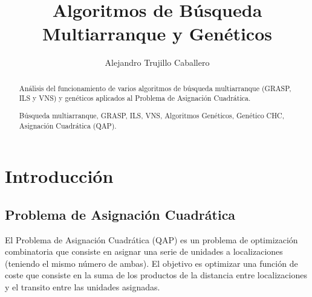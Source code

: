 \documentclass[runningheads,a4paper]{llncs}
\newcommand{\keywords}[1]{\par\addvspace\baselineskip
\noindent\keywordname\enspace\ignorespaces#1}
\begin{document}
\mainmatter  %

\title{Algoritmos de Búsqueda Multiarranque y Genéticos}


%
%
\author{Alejandro Trujillo Caballero
}
%


%
%

\toctitle{}
\maketitle

\begin{abstract}
Análisis del funcionamiento de varios algoritmos de búsqueda multiarranque (GRASP, ILS y VNS) y genéticos aplicados al Problema de Asignación Cuadrática.
\keywords{Búsqueda multiarranque, GRASP, ILS, VNS, Algoritmos Genéticos, Genético CHC, Asignación Cuadrática (QAP).}
\end{abstract}


\section{Introducción}

\subsection{Problema de Asignación Cuadrática}

El Problema de Asignación Cuadrática (QAP) es un problema de optimización combinatoria que consiste en asignar una serie de unidades a localizaciones (teniendo el mismo número de ambas). El objetivo es optimizar una función de coste que consiste en la suma de los productos de la distancia entre localizaciones y el transito entre las unidades asignadas.
\end{document}

